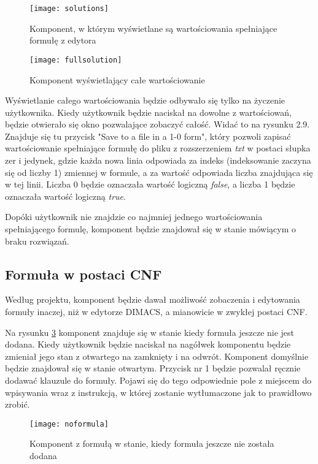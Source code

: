 \documentclass[a4paper,12pt]{book}
\theoremstyle{definition}
\begin{document}
\begin{figure}[ht]
    \centering
    \texttt{[image: solutions]}
    \caption{Komponent, w którym wyświetlane są wartościowania spełniające formułę z edytora}
    \label{fig:solutions}
\end{figure}

\begin{figure}[ht]
    \centering
    \texttt{[image: fullsolution]}
\caption{Komponent wyświetlający całe wartościowanie}
    \label{fig:fullsolution}
\end{figure}

Wyświetlanie całego wartościowania będzie odbywało się tylko na życzenie użytkownika. Kiedy użytkownik będzie naciskał na dowolne z wartościowań, będzie otwierało się okno pozwalające zobaczyć całość. Widać to na rysunku 2.9. Znajduje się tu przycisk "Save to a file in a 1-0 form", który pozwoli zapisać wartościowanie spełniające formułę do pliku z rozszerzeniem \textit{txt} w postaci słupka zer i jedynek, gdzie każda nowa linia odpowiada za indeks (indeksowanie zaczyna się od liczby 1) zmiennej w formule, a za wartość odpowiada liczba znajdująca się w tej linii. Liczba 0 będzie oznaczała wartość logiczną \textit{false}, a liczba 1 będzie oznaczała wartość logiczną \textit{true}.

Dopóki użytkownik nie znajdzie co najmniej jednego wartościowania spełniającego formulę, komponent będzie znajdował się w stanie mówiącym o braku rozwiązań.

\subsection{Formuła w postaci CNF}

Według projektu, komponent będzie dawał możliwość zobaczenia i edytowania formuły inaczej, niż w edytorze DIMACS, a mianowicie w zwykłej postaci CNF.

Na rysunku \ref{fig:noformula} komponent znajduje się w stanie kiedy formuła jeszcze nie jest dodana. Kiedy użytkownik będzie naciskał na nagółwek komponentu będzie zmieniał jego stan z otwartego na zamknięty i na odwrót. Komponent domyślnie będzie znajdował się w stanie otwartym. Przycisk nr 1 będzie pozwalał ręcznie dodawać klauzule do formuły. Pojawi się do tego odpowiednie pole z miejscem do wpisywania wraz z instrukcją, w której zostanie wytłumaczone jak to prawidłowo zrobić.

\begin{figure}[ht]
    \centering
    \texttt{[image: noformula]}
    \caption{Komponent z formułą w stanie, kiedy formuła jeszcze nie została dodana}
    \label{fig:noformula}
\end{figure}
\end{document}
